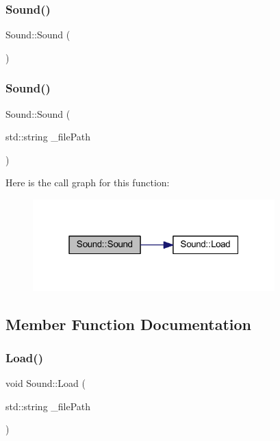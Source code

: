\subsubsection{\texorpdfstring{Sound()}{Sound()}\hspace{0.1cm}{\footnotesize\ttfamily [1/2]}}
{\footnotesize\ttfamily Sound\+::\+Sound (\begin{DoxyParamCaption}{ }\end{DoxyParamCaption})}

\mbox{\label{class_sound_ae588b8fb94e61912c7ecb5a3cea6f92d}} 
\subsubsection{\texorpdfstring{Sound()}{Sound()}\hspace{0.1cm}{\footnotesize\ttfamily [2/2]}}
{\footnotesize\ttfamily Sound\+::\+Sound (\begin{DoxyParamCaption}\item[{std\+::string}]{\+\_\+file\+Path }\end{DoxyParamCaption})}

Here is the call graph for this function\+:
\nopagebreak
\begin{figure}[H]
\begin{center}
\leavevmode
\includegraphics[width=265pt]{class_sound_ae588b8fb94e61912c7ecb5a3cea6f92d_cgraph}
\end{center}
\end{figure}


\subsection{Member Function Documentation}
\mbox{\label{class_sound_aa42f9f9625be20a1a84eeda8fac24cbb}} 
\subsubsection{\texorpdfstring{Load()}{Load()}}
{\footnotesize\ttfamily void Sound\+::\+Load (\begin{DoxyParamCaption}\item[{std\+::string}]{\+\_\+file\+Path }\end{DoxyParamCaption})}

